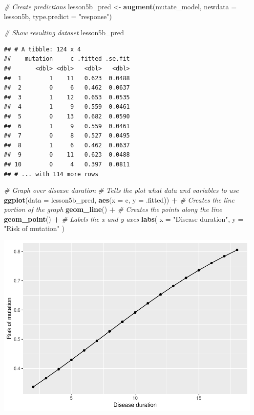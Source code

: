 \documentclass[]{book}
\newenvironment{Shaded}{\begin{snugshade}}{\end{snugshade}}
\newcommand{\CommentTok}[1]{\textcolor[rgb]{0.56,0.35,0.01}{\textit{#1}}}
\newcommand{\DataTypeTok}[1]{\textcolor[rgb]{0.13,0.29,0.53}{#1}}
\newcommand{\KeywordTok}[1]{\textcolor[rgb]{0.13,0.29,0.53}{\textbf{#1}}}
\newcommand{\NormalTok}[1]{#1}
\newcommand{\OperatorTok}[1]{\textcolor[rgb]{0.81,0.36,0.00}{\textbf{#1}}}
\newcommand{\StringTok}[1]{\textcolor[rgb]{0.31,0.60,0.02}{#1}}
\begin{document}
\begin{Shaded}
\begin{Highlighting}[]
\CommentTok{# Create predictions}
\NormalTok{lesson5b_pred <-}
\StringTok{  }\KeywordTok{augment}\NormalTok{(mutate_model,}
          \DataTypeTok{newdata =}\NormalTok{ lesson5b,}
          \DataTypeTok{type.predict =} \StringTok{"response"}\NormalTok{)}

\CommentTok{# Show resulting dataset}
\NormalTok{lesson5b_pred}
\end{Highlighting}
\end{Shaded}

\begin{verbatim}
## # A tibble: 124 x 4
##    mutation     c .fitted .se.fit
##       <dbl> <dbl>   <dbl>   <dbl>
##  1        1    11   0.623  0.0488
##  2        0     6   0.462  0.0637
##  3        1    12   0.653  0.0535
##  4        1     9   0.559  0.0461
##  5        0    13   0.682  0.0590
##  6        1     9   0.559  0.0461
##  7        0     8   0.527  0.0495
##  8        1     6   0.462  0.0637
##  9        0    11   0.623  0.0488
## 10        0     4   0.397  0.0811
## # ... with 114 more rows
\end{verbatim}

\begin{Shaded}
\begin{Highlighting}[]
\CommentTok{# Graph over disease duration}
\CommentTok{# Tells the plot what data and variables to use}
\KeywordTok{ggplot}\NormalTok{(}\DataTypeTok{data =}\NormalTok{ lesson5b_pred, }\KeywordTok{aes}\NormalTok{(}\DataTypeTok{x =}\NormalTok{ c, }\DataTypeTok{y =}\NormalTok{ .fitted)) }\OperatorTok{+}
\StringTok{  }\CommentTok{# Creates the line portion of the graph}
\StringTok{  }\KeywordTok{geom_line}\NormalTok{() }\OperatorTok{+}
\StringTok{  }\CommentTok{# Creates the points along the line}
\StringTok{  }\KeywordTok{geom_point}\NormalTok{() }\OperatorTok{+}
\StringTok{  }\CommentTok{# Labels the x and y axes}
\StringTok{  }\KeywordTok{labs}\NormalTok{(}
    \DataTypeTok{x =} \StringTok{"Disease duration"}\NormalTok{,}
    \DataTypeTok{y =} \StringTok{"Risk of mutation"}
\NormalTok{  )}
\end{Highlighting}
\end{Shaded}

\includegraphics{09-answers_files/figure-latex/week5l-1.pdf}
\end{document}
